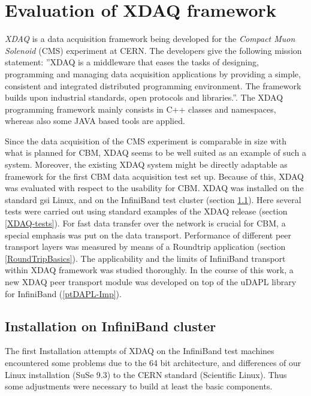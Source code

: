 \clearpage
\section{Evaluation of XDAQ framework}
\label{XDAQ-Mainchapter}

{\em XDAQ} \cite{XDAQ-wiki} is a data acquisition framework being developed for the {\em Compact Muon Solenoid} (CMS) experiment \cite{CMS-home} at CERN. The developers give the following mission statement:
''XDAQ is a middleware that eases the tasks of designing, 
programming and managing data acquisition applications by providing a simple, 
consistent and integrated distributed programming environment. 
The framework builds upon industrial standards, open protocols and libraries.''\cite{XDAQ-wiki}.
The XDAQ programming framework mainly consists in C++ classes
and namespaces, whereas also some JAVA based tools are applied.

Since the data acquisition of the CMS experiment is comparable in size with what is 
planned for CBM, XDAQ seems to be well suited as an example of such a system. Moreover,
the existing XDAQ system might be directly adaptable as framework for the first CBM
data acquisition test set up. Because of this, XDAQ was evaluated with respect to
the usability for CBM. XDAQ was installed on the standard gsi Linux,
and on the InfiniBand test cluster (section \ref{XDAQ-IB-install}).      
Here several tests were carried out using standard examples of the XDAQ release
(section \ref{XDAQ-tests}). For fast data transfer over the network is
crucial for CBM, a special emphasis was put on the data transport. 
Performance of different peer transport layers was measured by means of
a Roundtrip application (section \ref{RoundTripBasics}). The
applicability and the limits of InfiniBand transport within XDAQ framework 
was studied thoroughly. In
the course of this work, a new XDAQ peer transport module was developed
on top of the uDAPL library for InfiniBand   
(\ref{ptDAPL-Imp}).




\subsection{Installation on InfiniBand cluster}
\label{XDAQ-IB-install}
The first Installation attempts of XDAQ on the InfiniBand test machines encountered
some problems due to the 64 bit architecture, and differences of our Linux installation
(SuSe 9.3) to the CERN standard (Scientific Linux).
Thus some adjustments were necessary to build at least the basic
components.

